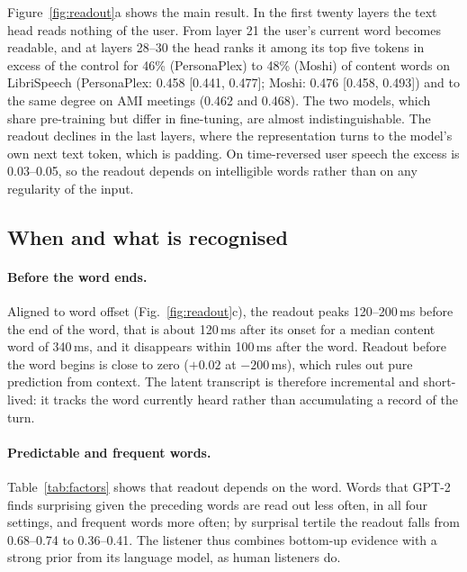 \documentclass[11pt,a4paper]{article}
\newcommand{\PP}{PersonaPlex}
\begin{document}
Figure~\ref{fig:readout}a shows the main result.
In the first twenty layers the text head reads nothing of the user.
From layer 21 the user's current word becomes readable, and at layers 28--30 the head ranks it among its top five tokens in excess of the control for 46\% (\PP) to 48\% (Moshi) of content words on LibriSpeech (\PP: 0.458 [0.441, 0.477]; Moshi: 0.476 [0.458, 0.493]) and to the same degree on AMI meetings (0.462 and 0.468).
The two models, which share pre-training but differ in fine-tuning, are almost indistinguishable.
The readout declines in the last layers, where the representation turns to the model's own next text token, which is padding.
On time-reversed user speech the excess is 0.03--0.05, so the readout depends on intelligible words rather than on any regularity of the input.

\subsection{When and what is recognised}
\label{sec:what}

\paragraph{Before the word ends.}
Aligned to word offset (Fig.~\ref{fig:readout}c), the readout peaks 120--200\,ms before the end of the word, that is about 120\,ms after its onset for a median content word of 340\,ms, and it disappears within 100\,ms after the word.
Readout before the word begins is close to zero ($+0.02$ at $-200$\,ms), which rules out pure prediction from context.
The latent transcript is therefore incremental and short-lived: it tracks the word currently heard rather than accumulating a record of the turn.

\begin{table}[t]
\centering\small
\setlength\tabcolsep{4pt}
\resizebox{\columnwidth}{!}{}
\caption{Which words are read out: standardised coefficients of a logistic regression of readout at the best layer. $^{*}$: 95\% bootstrap CI excludes zero.}
\label{tab:factors}
\end{table}

\paragraph{Predictable and frequent words.}
Table~\ref{tab:factors} shows that readout depends on the word.
Words that GPT-2 \citep{radford2019gpt2} finds surprising given the preceding words are read out less often, in all four settings, and frequent words \citep{speer2022wordfreq} more often; by surprisal tertile the readout falls from 0.68--0.74 to 0.36--0.41.
The listener thus combines bottom-up evidence with a strong prior from its language model, as human listeners do.
\end{document}
